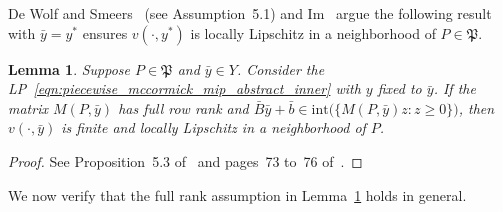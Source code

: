 \documentclass{article}
\newtheorem{lemma}[theorem]{Lemma}
\begin{document}
De Wolf and Smeers~\cite{de2021generalized} (see Assumption~5.1) and Im~\cite{im2018sensitivity} argue the following result with $\bar{y} = y^*$ ensures $v(\cdot,y^*)$ is locally Lipschitz in a neighborhood of $P \in \mathfrak{P}$.

\begin{lemma}
\label{lem:genl_grad_assumptions}
Suppose $P \in \mathfrak{P}$ and $\bar{y} \in Y$.
Consider the LP~\eqref{eqn:piecewise_mccormick_mip_abstract_inner} with $y$ fixed to $\bar{y}$.
If the matrix $M(P,\bar{y})$ has full row rank and $\bar{B}\bar{y} + \bar{b} \in \text{int}\bigl( \{ M(P,\bar{y})z : z \geq 0 \}  \bigr)$, then $v(\cdot,\bar{y})$ is finite and locally Lipschitz in a neighborhood of $P$.
\end{lemma}
\begin{proof}
See Proposition~5.3 of~\cite{de2021generalized} and pages~73 to~76 of~\cite{im2018sensitivity}.
\end{proof}


We now verify that the full rank assumption in Lemma~\ref{lem:genl_grad_assumptions} holds in general.
\end{document}
